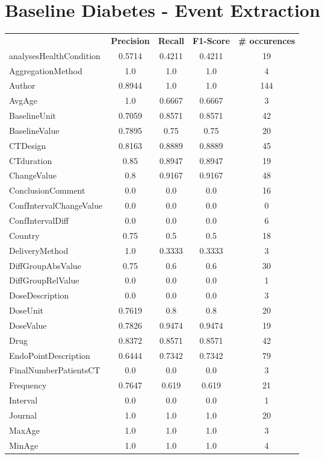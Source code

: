 \section{Baseline Diabetes - Event Extraction}
\begin{longtable}{ l c c c c}
 & \textbf{Precision} & \textbf{Recall} & \textbf{F1-Score} & \textbf{\# occurences} \\ \cline{1-5}
analysesHealthCondition & 0.5714 & 0.4211 & 0.4211 & 19\\
AggregationMethod & 1.0 & 1.0 & 1.0 & 4\\
Author & 0.8944 & 1.0 & 1.0 & 144\\
AvgAge & 1.0 & 0.6667 & 0.6667 & 3\\
BaselineUnit & 0.7059 & 0.8571 & 0.8571 & 42\\
BaselineValue & 0.7895 & 0.75 & 0.75 & 20\\
CTDesign & 0.8163 & 0.8889 & 0.8889 & 45\\
CTduration & 0.85 & 0.8947 & 0.8947 & 19\\
ChangeValue & 0.8 & 0.9167 & 0.9167 & 48\\
ConclusionComment & 0.0 & 0.0 & 0.0 & 16\\
ConfIntervalChangeValue & 0.0 & 0.0 & 0.0 & 0\\
ConfIntervalDiff & 0.0 & 0.0 & 0.0 & 6\\
Country & 0.75 & 0.5 & 0.5 & 18\\
DeliveryMethod & 1.0 & 0.3333 & 0.3333 & 3\\
DiffGroupAbsValue & 0.75 & 0.6 & 0.6 & 30\\
DiffGroupRelValue & 0.0 & 0.0 & 0.0 & 1\\
DoseDescription & 0.0 & 0.0 & 0.0 & 3\\
DoseUnit & 0.7619 & 0.8 & 0.8 & 20\\
DoseValue & 0.7826 & 0.9474 & 0.9474 & 19\\
Drug & 0.8372 & 0.8571 & 0.8571 & 42\\
EndoPointDescription & 0.6444 & 0.7342 & 0.7342 & 79\\
FinalNumberPatientsCT & 0.0 & 0.0 & 0.0 & 3\\
Frequency & 0.7647 & 0.619 & 0.619 & 21\\
Interval & 0.0 & 0.0 & 0.0 & 1\\
Journal & 1.0 & 1.0 & 1.0 & 20\\
MaxAge & 1.0 & 1.0 & 1.0 & 3\\
MinAge & 1.0 & 1.0 & 1.0 & 4\\

\end{longtable}

